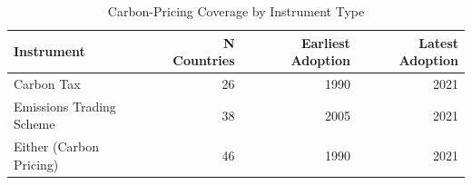 \begin{table}
\caption{Carbon-Pricing Coverage by Instrument Type}
\label{tab:coverage}
\begin{tabular}{lrrr}
\toprule
Instrument & N Countries & Earliest Adoption & Latest Adoption \\
\midrule
Carbon Tax & 26 & 1990 & 2021 \\
Emissions Trading Scheme & 38 & 2005 & 2021 \\
Either (Carbon Pricing) & 46 & 1990 & 2021 \\
\bottomrule
\end{tabular}
\end{table}
